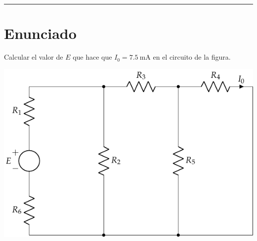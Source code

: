   \noindent\rule{\linewidth}{2.8pt}


  \section{Enunciado}
  Calcular el valor de $E$ que hace que $I_0=\qty{7.5}{\milli\ampere}$
  en el circuito de la figura.

  \begin{center}
    \includegraphics{figuras/BT1_03.pdf}
  \end{center}


